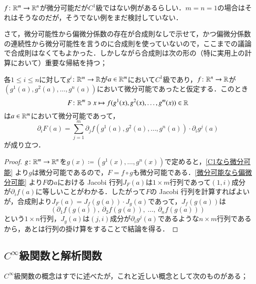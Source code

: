 \begin{que}[*]
$f \colon \mathbb{R}^m \to \mathbb{R}^n$が微分可能だが$C^1$級ではない例があるらしい．$m=n=1$の場合はそれはそうなのだが，そうでない例をまだ検討していない．
\end{que}

さて，微分可能性から偏微分係数の存在が合成則なしで示せて，かつ偏微分係数の連続性から微分可能性を言うのに合成則を使っていないので，ここまでの議論で合成則はなくてもよかった．しかしながら合成則は次の形の（特に実用上の計算において）重要な帰結を持つ；

\begin{prop}\label{実用的な方の合成則}
各$1 \leq i \leq n$に対して$g^i \colon \mathbb{R}^m \to \mathbb{R}$が$a \in \mathbb{R}^m$において$C^1$級であり，$f \colon \mathbb{R}^n \to \mathbb{R}$が$(g^1(a), g^2(a), \dots, g^n(a))$において微分可能であったと仮定する．このとき
\begin{equation}
F \colon \mathbb{R}^m \ni x \mapsto f(g^1(x), g^2(x), \dots, g^m(x)) \in \mathbb{R}
\end{equation}
は$a \in \mathbb{R}^m$において微分可能であって，
\begin{equation}
\partial_i F (a) = \sum_{j=1}^m \partial_j f(g^1(a), g^2(a), \dots, g^n(a)) \cdot \partial_i g^j (a)
\end{equation}が成り立つ．
\end{prop}

\begin{proof}
$g \colon \mathbb{R}^m \to \mathbb{R}^n$を$g(x) \coloneqq (g^1(x), \dots, g^n(x))$で定めると，\cref{C1なら微分可能} より$g$は微分可能であるので，$F = f \circ g$も微分可能である．\cref{微分可能なら偏微分可能} より$F$の$a$における Jacobi 行列$J_F(a)$は$1 \times m$行列であって$(1,i)$成分が$\partial_i f (a)$に等しいことがわかる．したがって$F$の Jacobi 行列を計算すればよいが，合成則より$J_F(a) = J_f (g(a)) \cdot J_g(a)$であって，$J_f(g(a))$は
\begin{equation}
\left( \partial_1 f(g(a)),\ \partial_2 f(g(a)),\ \dots,\ \partial_n f(g(a))  \right)
\end{equation}という$1 \times n$行列，$J_g(a)$は$(j,i)$成分が$\partial_i g^j(a)$であるような$n \times m$行列であるから，あとは行列の掛け算をすることで結論を得る．
\end{proof}

\subsection{$C^\infty$級関数と解析関数}

$C^\infty$級関数の概念はすでに述べたが，これと近しい概念として次のものがある；


